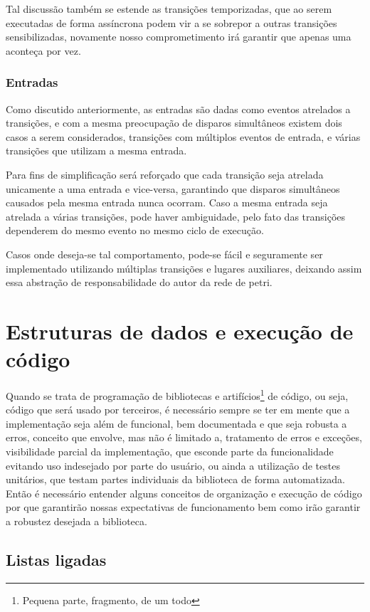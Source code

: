 Tal discussão também se estende as transições temporizadas, que ao serem executadas de forma assíncrona podem vir a se sobrepor a outras transições sensibilizadas, novamente nosso comprometimento irá garantir que apenas uma aconteça por vez.  

\subsubsection{Entradas}

Como discutido anteriormente, as entradas são dadas como eventos atrelados a transições, e com a mesma preocupação de disparos simultâneos existem dois casos a serem considerados, transições com múltiplos eventos de entrada, e várias transições que utilizam a mesma entrada.

Para fins de simplificação será reforçado que cada transição seja atrelada unicamente a uma entrada e vice-versa, garantindo que disparos simultâneos causados pela mesma entrada nunca ocorram. Caso a mesma entrada seja atrelada a várias transições, pode haver ambiguidade, pelo fato das transições dependerem do mesmo evento no mesmo ciclo de execução.

Casos onde deseja-se tal comportamento, pode-se fácil e seguramente ser implementado utilizando múltiplas transições e lugares auxiliares, deixando assim essa abstração de responsabilidade do autor da rede de petri.

\section{Estruturas de dados e execução de código}

Quando se trata de programação de bibliotecas e artifícios\footnote{Pequena parte, fragmento, de um todo} de código, ou seja, código que será usado por terceiros, é necessário sempre se ter em mente que a implementação seja além de funcional, bem documentada e que seja robusta a erros, conceito que envolve, mas não é limitado a, tratamento de erros e exceções, visibilidade parcial da implementação, que esconde parte da funcionalidade evitando uso indesejado por parte do usuário, ou ainda a utilização de testes unitários, que testam partes individuais da biblioteca de forma automatizada. Então é necessário entender alguns conceitos de organização e execução de código por que garantirão nossas expectativas de funcionamento bem como irão garantir a robustez desejada a biblioteca. 

\subsection{Listas ligadas}

